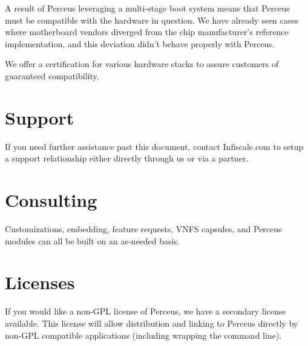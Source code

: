 \documentclass[10pt,letterpaper]{report}
\begin{document}
A result of Perceus leveraging a multi-stage boot system means that Perceus
must be compatible with the hardware in question.  We have already seen cases
where motherboard vendors diverged from the chip manufacturer's reference
implementation, and this deviation didn't behave properly with Perceus.

We offer a certification for various hardware stacks to assure customers of
guaranteed compatibility.

\section{Support}

If you need further assistance past this document, contact Infiscale.com to
setup a support relationship either directly through us or via a partner.

\section{Consulting}

Customizations, embedding, feature requests, VNFS capsules, and Perceus
modules can all be built on an as-needed basis.

\section{Licenses}

If you would like a non-GPL license of Perceus, we have a secondary license
available.  This license will allow distribution and linking to Perceus
directly by non-GPL compatible applications (including wrapping the command
line).

\indent 
\end{document}

